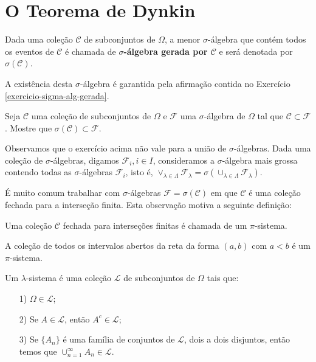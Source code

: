 \section{O Teorema de Dynkin}

\begin{definicao} 
    Dada uma coleção $\mathcal{C} $ de subconjuntos de $\Omega$, a menor
    $\sigma$-álgebra que contém todos os eventos de $\mathcal{C}$ é chamada
    de \textbf{$\sigma$-álgebra gerada por $\mathcal{C}$} e será
    denotada por $\sigma(\mathcal{C})$.
\end{definicao} 
A existência desta $\sigma$-álgebra é garantida pela afirmação 
contida no Exercício \ref{exercicio-sigma-alg-gerada}.
	    
	    
	    
	    
	    
    \begin{exercicio}\label{exer-sigma-gerada-contida-todas}
        Seja $\mathcal{C}$ uma coleção de subconjuntos de $\Omega$ e $\mathcal{F}$
        uma $\sigma$-álgebra de $\Omega$ tal que $\mathcal{C} \subset \mathcal{F}$.
        Mostre que  $\sigma(\mathcal{C}) \subset \mathcal{F}$.
    \end{exercicio}

    
    Observamos que o exercício acima não vale para a união de $\sigma$-álgebras. 
    Dada uma coleção de $\sigma$-álgebras, digamos $\mathcal{F}_{i}, i \in I$,
    consideramos a $\sigma$-álgebra mais grossa contendo todas as $\sigma$-álgebras 
    $\mathcal{F}_{i}$, isto é, 
    $\vee_{\lambda \in \Lambda} \mathcal{F}_{\lambda} = 
    \sigma (\cup_{\lambda \in \Lambda} \mathcal{F}_\lambda)$. 
    
    É muito comum trabalhar com $\sigma$-álgebras 
    $\mathcal{F}= \sigma(\mathcal{C})$ em que $\mathcal{C}$ é uma 
    coleção fechada para a interseção finita. Esta observação motiva 
    a seguinte definição:
    
\begin{definicao}[$\pi$-sistema]\label{def-pi-sistema}
   Uma coleção $\mathcal{C} $ fechada para interseções finitas é 
    chamada de um $\pi$-sistema.
\end{definicao} 
 
\begin{exemplo}
	A coleção de todos os intervalos abertos da reta da 
	forma $(a,b)$ com $a<b$ é um $\pi$-sistema.
\end{exemplo}
 
    
\begin{definicao}
    Um $\lambda$-sistema é uma coleção $\mathcal{L}$ de subconjuntos
    de $\Omega$ tais que:
    \begin{itemize}
        \item[1)] $ \Omega \in \mathcal{L}$;
        \item[2)] Se $ A \in \mathcal{L}$, então $ A^c \in \mathcal{L} $;
        \item[3)] Se $ \{A_n\}$ é uma família de conjuntos de $\mathcal{L}$, dois a
        dois disjuntos, então temos que $ \cup_{n=1}^{\infty} A_n \in \mathcal{L} $.
     \end{itemize}
\end{definicao}

